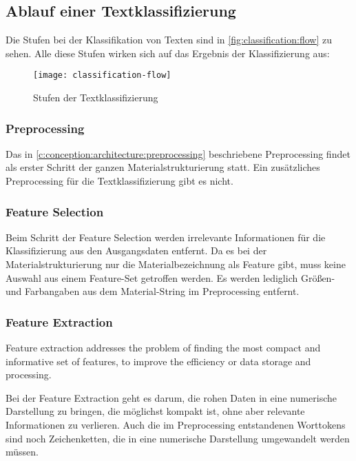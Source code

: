 \subsection{Ablauf einer Textklassifizierung}
\label{c:conception:classification:steps}
Die Stufen bei der Klassifikation von Texten sind in \autoref{fig:classification:flow} zu sehen. Alle diese Stufen wirken sich auf das Ergebnis der Klassifizierung aus:

\begin{figure}[h]
	\centering
	\texttt{[image: classification-flow]}
	\caption{Stufen der Textklassifizierung}
	\label{fig:classification:flow}
\end{figure}

\subsubsection{Preprocessing}
Das in \autoref{c:conception:architecture:preprocessing} beschriebene Preprocessing findet als erster Schritt der ganzen Materialstrukturierung statt. Ein zusätzliches Preprocessing für die Textklassifizierung gibt es nicht.

\subsubsection{Feature Selection}
Beim Schritt der Feature Selection werden irrelevante Informationen für die Klassifizierung aus den Ausgangsdaten entfernt. Da es bei der Materialstrukturierung nur die Materialbezeichnung als Feature gibt, muss keine Auswahl aus einem Feature-Set getroffen werden. Es werden lediglich Größen- und Farbangaben aus dem Material-String im Preprocessing entfernt.

\subsubsection{Feature Extraction}
\begin{definition}
	\label{def:feature-extraction}
	\glqq Feature extraction addresses the problem of finding the most compact and informative set of features, to improve the efficiency or data storage and processing.\grqq{} \citep{Guyon2006}
\end{definition}
Bei der Feature Extraction geht es darum, die rohen Daten in eine numerische Darstellung zu bringen, die möglichst kompakt ist, ohne aber relevante Informationen zu verlieren.
Auch die im Preprocessing entstandenen Worttokens sind noch Zeichenketten, die in eine numerische Darstellung umgewandelt werden müssen.

